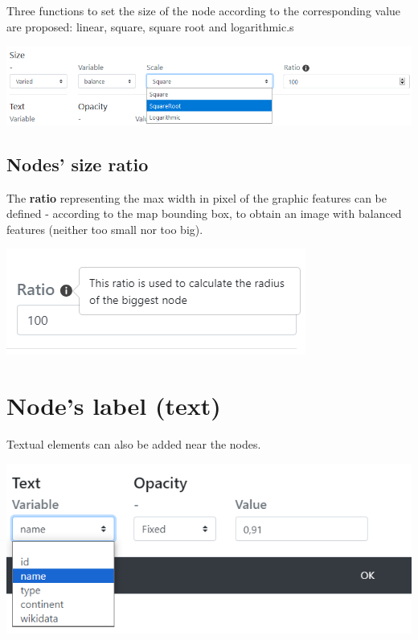 \documentclass[
  letterpaper,
  DIV=11,
  numbers=noendperiod]{scrreprt}
\begin{document}
Three functions to set the size of the node according to the
corresponding value are proposed: linear, square, square root and
logarithmic.s

\includegraphics{images/geom_add_nodes_2_size_fct.png}

\subsection{Nodes' size ratio}\label{nodes-size-ratio}

The \textbf{ratio} representing the max width in pixel of the graphic
features can be defined - according to the map bounding box, to obtain
an image with balanced features (neither too small nor too big).

\includegraphics{images/geom_add_nodes_2_size_ratio.png}

\section{\texorpdfstring{\textbf{Node's label
(text)}}{Node's label (text)}}\label{nodes-label-text}

Textual elements can also be added near the nodes.

\includegraphics{images/geom_add_nodes_3_texte.png}
\end{document}
